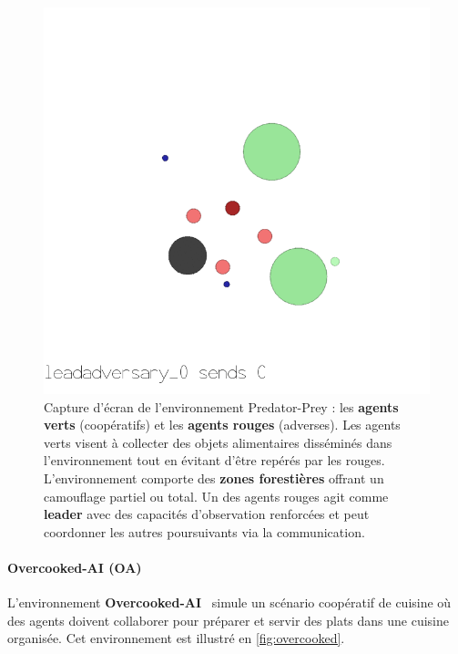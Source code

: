 \begin{figure}[h!]
    \centering
    \includegraphics[width=0.6\linewidth]{figures/predator_prey.png}
    \caption{Capture d'écran de l'environnement Predator-Prey : les \textbf{agents verts} (coopératifs) et les \textbf{agents rouges} (adverses). Les agents verts visent à collecter des objets alimentaires disséminés dans l'environnement tout en évitant d'être repérés par les rouges. L'environnement comporte des \textbf{zones forestières} offrant un camouflage partiel ou total. Un des agents rouges agit comme \textbf{leader} avec des capacités d'observation renforcées et peut coordonner les autres poursuivants via la communication.}
    \label{fig:predator_prey}
\end{figure}

\paragraph{Overcooked-AI (OA)}

L'environnement \textbf{Overcooked-AI}~\cite{overcookedai} simule un scénario coopératif de cuisine où des agents doivent collaborer pour préparer et servir des plats dans une cuisine organisée. Cet environnement est illustré en \autoref{fig:overcooked}.


